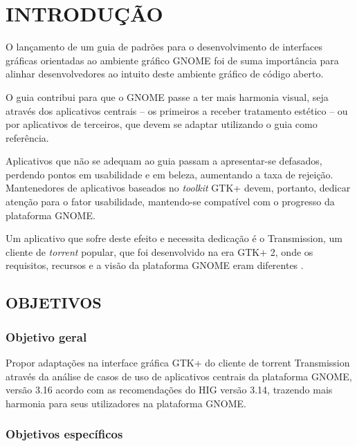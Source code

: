 \documentclass[
    12pt,               %
    openright,          %
    oneside,            %
    a4paper,            %
    chapter=TITLE,      %
    section=TITLE,      %
    english,
    brazil              %
]{abntex2}
\begin{document}
\textual

\chapter{INTRODUÇÃO}

O lançamento de um guia de padrões para o desenvolvimento de interfaces gráficas
orientadas ao ambiente gráfico GNOME foi de suma importância para alinhar
desenvolvedores ao intuito deste ambiente gráfico de código aberto.

O guia contribui para que o GNOME passe a ter mais harmonia visual, seja através
dos aplicativos centrais -- os primeiros a receber tratamento estético -- ou
por aplicativos de terceiros, que devem se adaptar utilizando o guia como
referência.

Aplicativos que não se adequam ao guia passam a apresentar-se defasados,
perdendo pontos em usabilidade e em beleza, aumentando a taxa de rejeição.
Mantenedores de aplicativos baseados no \textit{toolkit} GTK+ devem, portanto,
dedicar atenção para o fator usabilidade, mantendo-se compatível com o progresso
da plataforma GNOME.

Um aplicativo que sofre deste efeito e necessita dedicação é o Transmission, um
cliente de \textit{torrent} popular, que foi desenvolvido na era GTK+ 2, onde os
requisitos, recursos e a visão da plataforma GNOME eram diferentes
\cite{gnome221hig}.

\section{OBJETIVOS}

\subsection{Objetivo geral}

Propor adaptações na interface gráfica GTK+ do cliente de torrent Transmission
através da análise de casos de uso de aplicativos centrais da plataforma GNOME,
versão 3.16 acordo com as recomendações do HIG versão 3.14, trazendo mais
harmonia para seus utilizadores na plataforma GNOME.

\subsection{Objetivos específicos}
\end{document}
